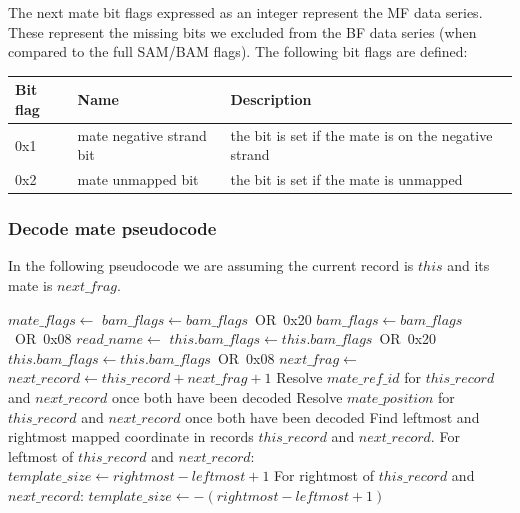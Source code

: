 \documentclass[a4paper]{article}
\begin{document}
The next mate bit flags expressed as an integer represent the MF data series.
These represent the missing bits we excluded from the BF data series (when compared to the full SAM/BAM flags).
The following bit flags are defined:

\begin{tabular}{|>{\raggedright}p{47pt}|>{\raggedright}p{134pt}|>{\raggedright}p{250pt}|}
\hline
\textbf{Bit flag} & \textbf{Name} & \textbf{Description}\tabularnewline
\hline
0x1 & mate negative strand bit & the bit is set if the mate is on the negative
strand\tabularnewline
\hline
0x2 & mate unmapped bit & the bit is set if the mate is unmapped\tabularnewline
\hline
\end{tabular}


\subsubsection*{\textbf{Decode mate pseudocode}}

In the following pseudocode we are assuming the current record is $this$ and its mate is $next\_frag$.

\begin{algorithmic}[1]
  \State $mate\_flags\gets $ 
    \State $bam\_flags\gets bam\_flags$\ OR\ 0x20
  \EndIf
    \State $bam\_flags\gets bam\_flags$\ OR\ 0x08
  \EndIf
    \State $read\_name \gets$ 
  \EndIf
\settowidth{\maxwidth}{mate\_position\ }
\State {}  
\State {} 
\State {} 
    \State $this.bam\_flags \gets this.bam\_flags$\ OR\ 0x20
  \EndIf
    \State $this.bam\_flags \gets this.bam\_flags$\ OR\ 0x08
  \EndIf
  \State $next\_frag\gets$ 
  \State $next\_record\gets this\_record + next\_frag + 1$
  \State Resolve $mate\_ref\_id$ for $this\_record$ and $next\_record$ once both have been decoded
  \State Resolve $mate\_position$ for $this\_record$ and $next\_record$ once both have been decoded
  \State Find leftmost and rightmost mapped coordinate in records $this\_record$ and $next\_record$.
  \State For leftmost of $this\_record$ and $next\_record$: $template\_size\gets rightmost-leftmost+1$
  \State For rightmost of $this\_record$ and $next\_record$: $template\_size\gets -(rightmost-leftmost+1)$
\EndIf
\EndProcedure
\end{algorithmic}
\end{document}
